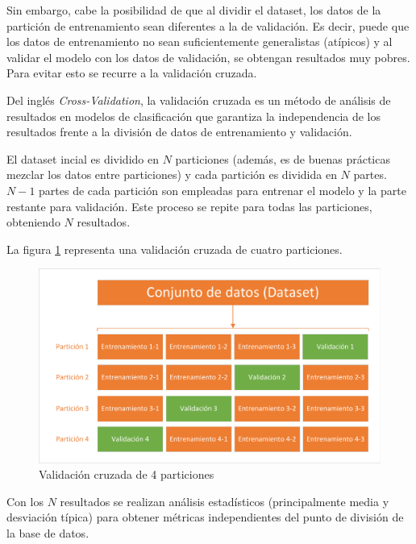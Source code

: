 Sin embargo, cabe la posibilidad de que al dividir el dataset, los datos de la partición de entrenamiento sean diferentes a la de validación. Es decir, puede que los datos de entrenamiento no sean suficientemente generalistas (atípicos) y al validar el modelo con los datos de validación, se obtengan resultados muy pobres. Para evitar esto se recurre a la validación cruzada.

Del inglés \textit{Cross-Validation}, la validación cruzada es un método de análisis de resultados en modelos de clasificación que garantiza la independencia de los resultados frente a la división de datos de entrenamiento y validación.

El dataset incial es dividido en $N$ particiones (además, es de buenas prácticas mezclar los datos entre particiones) y cada partición es dividida en $N$ partes. $N-1$ partes de cada partición son empleadas para entrenar el modelo y la parte restante para validación. Este proceso se repite para todas las particiones, obteniendo $N$ resultados.

La figura \ref{fig:CV_cv4} representa una validación cruzada de cuatro particiones.

\begin{figure}[h]
	\centering
	\captionsetup{justification=centering}
	\includegraphics[width=\textwidth]{imagenes/marco_teorico/CV/cv_4.pdf}
	\caption{Validación cruzada de 4 particiones}
	\label{fig:CV_cv4}
\end{figure}

Con los $N$ resultados se realizan análisis estadísticos (principalmente media y desviación típica) para obtener métricas independientes del punto de división de la base de datos.

